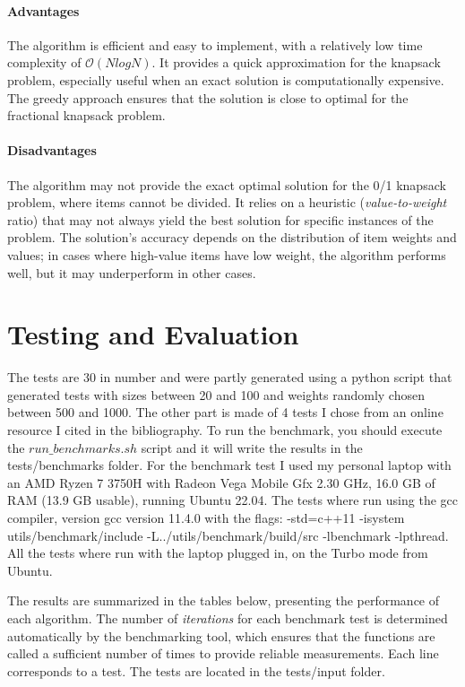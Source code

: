 \documentclass[runningheads]{llncs}
\begin{document}
\paragraph{Advantages}
The algorithm is efficient and easy to implement, with a relatively low time complexity of 
$\mathcal{O}(NlogN)$. It provides a quick approximation for the knapsack problem, especially useful
when an exact solution is computationally expensive. The greedy approach ensures that the solution
is close to optimal for the fractional knapsack problem.

\paragraph{Disadvantages}
The algorithm may not provide the exact optimal solution for the 0/1 knapsack problem, where items
cannot be divided. It relies on a heuristic (\textit{value-to-weight} ratio) that may not always
yield the best solution for specific instances of the problem. The solution's accuracy depends on 
the distribution of item weights and values; in cases where high-value items have low weight, the 
algorithm performs well, but it may underperform in other cases.

\section{Testing and Evaluation}
The tests are 30 in number and were partly generated using a python script that generated tests with
sizes between 20 and 100 and weights randomly chosen between 500 and 1000. The other part is made of
4 tests I chose from an online resource I cited in the bibliography. To run the benchmark, you should
execute the $run\_benchmarks.sh$ script and it will write the results in the 
tests/benchmarks folder.
For the benchmark test I used my personal laptop with an AMD Ryzen 7 3750H with Radeon Vega Mobile
Gfx 2.30 GHz, 16.0 GB of RAM (13.9 GB usable), running Ubuntu 22.04. The tests where run using the
gcc compiler, version gcc version 11.4.0 with the flags: -std=c++11 -isystem utils/benchmark/include 
-L../utils/benchmark/build/src -lbenchmark -lpthread. All the tests where run with the laptop plugged
in, on the Turbo mode from Ubuntu.

The results are summarized in the tables below, presenting the performance of each algorithm. The 
number of \textit{iterations} for each benchmark test is determined automatically by the 
benchmarking tool, which ensures that the functions are called a sufficient number of times to 
provide reliable measurements. Each line corresponds to a test. The tests are located in the tests/input folder.
\end{document}
